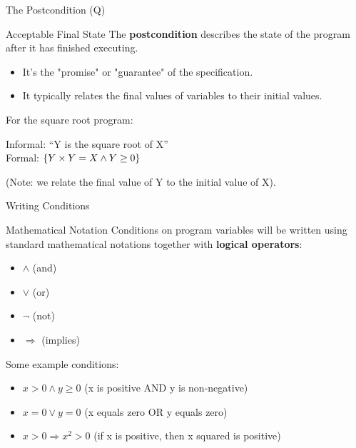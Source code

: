 \begin{frame}{The Postcondition (Q)}
    \begin{block}{Acceptable Final State}
        The \textbf{postcondition} describes the state of the program after it has finished executing.
        \begin{itemize}
            \item It's the "promise" or "guarantee" of the specification.
            \item It typically relates the final values of variables to their initial values.
        \end{itemize}
    \end{block}

    \begin{example}
        For the square root program:
        \begin{center}
            Informal: ``Y is the square root of X''\\
            Formal: $\{Y \times Y = X \wedge Y \ge 0\}$
        \end{center}
        (Note: we relate the final value of Y to the initial value of X).
    \end{example}
\end{frame}

\begin{frame}{Writing Conditions}
    \begin{block}{Mathematical Notation}
        Conditions on program variables will be written using standard mathematical notations together with \textbf{logical operators}:
        \begin{itemize}
            \item $\wedge$ (and)
            \item $\vee$ (or)
            \item $\neg$ (not)
            \item $\Rightarrow$ (implies)
        \end{itemize}
    \end{block}
    
    \begin{example}
        Some example conditions:
        \begin{itemize}
            \item $x > 0 \wedge y \geq 0$ (x is positive AND y is non-negative)
            \item $x = 0 \vee y = 0$ (x equals zero OR y equals zero)
            \item $x > 0 \Rightarrow x^2 > 0$ (if x is positive, then x squared is positive)
        \end{itemize}
    \end{example}
\end{frame}

